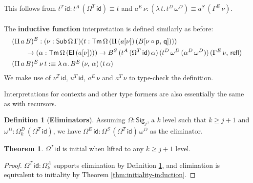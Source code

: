 \documentclass[12pt,a4paper,twoside,openany]{book}
\theoremstyle{remark}
\theoremstyle{definition}
\newtheorem{mydefinition}{Definition}
\theoremstyle{theorem}
\newtheorem{theorem}{Theorem}
\newcommand{\refl}{\mathsf{refl}}
\newcommand{\id}{\mathsf{id}}
\newcommand{\Sub}{\mathsf{Sub}}
\newcommand{\Tm}{\mathsf{Tm}}
\newcommand{\El}{\mathsf{El}}
\newcommand{\Sig}{\mathsf{Sig}}
\newcommand{\p}{\mathsf{p}}
\newcommand{\q}{\mathsf{q}}
\newcommand{\defn}{:\equiv}
\begin{document}
This follows from $t^T\,\id : t^A\,(\Omega^T\,\id) \equiv t$ and $a^E\,\nu : (\lambda\,t.\,t^D\,\omega^D) \equiv a^S\,(\Gamma^E\,\nu)$.
\\\\
\noindent The \textbf{inductive function} interpretation is defined similarly as before:
\begin{alignat*}{3}
 &(\Pi\,a\,B)^E : (\nu : \Sub\,\Omega\,\Gamma)(t : \Tm\,\Omega\,(\Pi\,(a[\nu])\,(B[\nu\circ\p,\,\q])))\\
 & \hspace{2em}\to (\alpha : \Tm\,\Omega\,(\El\,(a[\nu]))) \to B^S\,(t^A\,(\Omega^T\,\id)\,\alpha)\,(t^D\,\omega^D\,(\alpha^D\,\omega^D))\,(\Gamma^E\,\nu,\,\refl)\\
 &\rlap{$(\Pi\,a\,B)^E\,\nu\,t \defn \lambda\,\alpha.\,B^E\,(\nu,\,\alpha)\,(t\,\alpha)$}
\end{alignat*}
We make use of $\nu^T\,\id$, $u^T\,\id$, $a^E\,\nu$ and $a^T\,\nu$ to type-check the definition.

Interpretations for contexts and other type formers are also essentially the same as with recursors.

\begin{mydefinition}[\textbf{Eliminators}]
\label{def:fqiit-eliminator}
Assuming $\Omega : \Sig_j$, a $k$ level such that $k \geq j + 1$ and $\omega^D :
\Omega^D_{k}\,(\Omega^T\,\id)$, we have $\Omega^E\,\id : \Omega^S\,(\Omega^T\,\id)\,\omega^D$ as
the eliminator.
\end{mydefinition}

\begin{theorem}
  $\Omega^T\,\id$ is initial when lifted to any $k \geq j + 1$ level.
\end{theorem}
\begin{proof}
  $\Omega^T\,\id : \Omega^A_{k}$ supports elimination by Definition \ref{def:fqiit-eliminator},
  and elimination is equivalent to initiality by Theorem \ref{thm:initiality-induction}.
\end{proof}


\end{document}
